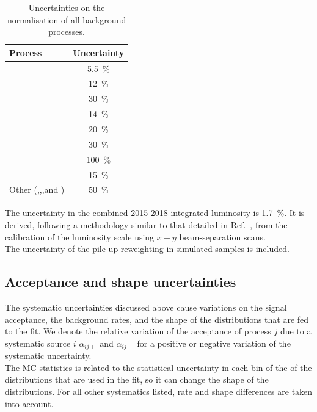 \begin{table}[t]
	\small
	\centering
	\begin{tabular}{l c }
		\toprule
		\textbf{Process} & Uncertainty \\
		\midrule
		\ttbar & \SI{5.5}{\%} \\
		\ttV    & \SI{12}{\%} \\
		\tWZ & \SI{30}{\%} \\
		\tZq & \SI{14}{\%} \\
		\VVLF & \SI{20}{\%} \\
		\VVHF & \SI{30}{\%} \\
		\Zjets & \SI{100}{\%} \\
		 \ttH    & \SI{15}{\%} \\
		Other (\ttt,\tttt,\VVV,\VH and \ttWW) & \SI{50}{\%} \\		
		\bottomrule
	\end{tabular}
	\caption{Uncertainties on the normalisation of all background processes.}
	\label{tab:syst-crosssections}
\end{table}
\FloatBarrier
\noindent The uncertainty in the combined 2015-2018 integrated luminosity is
\SI{1.7}{\%}. It is derived, following a methodology similar to that
detailed in Ref.~\cite{DAPR-2013-01}, from the calibration of the
luminosity scale using $x-y$ beam-separation scans.\\
The uncertainty of the pile-up reweighting in simulated samples is included.

\subsection {Acceptance and shape uncertainties}
\label{sec:systematic:treatment}

The systematic uncertainties discussed above cause variations on the signal
acceptance, the background rates, and the shape of the distributions
that are fed to the fit.
We denote the relative variation of the acceptance of process $j$
due to a systematic source $i$ $\alpha_{ij+}$ and $\alpha_{ij-}$ for a
positive or negative variation of the systematic uncertainty.		\\
The MC statistics is related to the statistical uncertainty in each
bin of the of the distributions that are used in the fit,
so it can change the shape of the distributions. 
For all other systematics listed, rate and shape differences are taken
into account. \\
